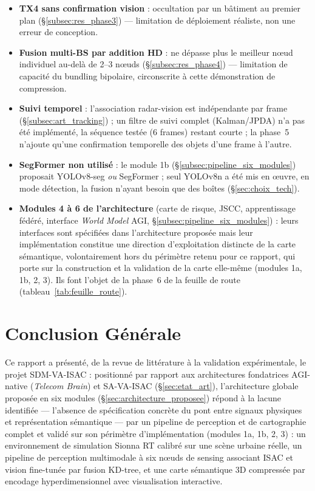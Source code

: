 \documentclass[12pt,a4paper,titlepage]{article}
\begin{document}
\begin{itemize}[leftmargin=1.5em]
    \item \textbf{TX4 sans confirmation vision} : occultation par un bâtiment au premier plan (\S\ref{subsec:res_phase3}) --- limitation de déploiement réaliste, non une erreur de conception.
    \item \textbf{Fusion multi-BS par addition HD} : ne dépasse plus le meilleur n\oe ud individuel au-delà de 2--3 n\oe uds (\S\ref{subsec:res_phase4}) --- limitation de capacité du bundling bipolaire, circonscrite à cette démonstration de compression.
    \item \textbf{Suivi temporel} : l'association radar-vision est indépendante par frame (\S\ref{subsec:art_tracking}) ; un filtre de suivi complet (Kalman/JPDA) n'a pas été implémenté, la séquence testée (6 frames) restant courte ; la phase~5 n'ajoute qu'une confirmation temporelle des objets d'une frame à l'autre.
    \item \textbf{SegFormer non utilisé} : le module 1b (\S\ref{subsec:pipeline_six_modules}) proposait YOLOv8-seg \textit{ou} SegFormer ; seul YOLOv8n a été mis en \oe uvre, en mode détection, la fusion n'ayant besoin que des boîtes (\S\ref{sec:choix_tech}).
    \item \textbf{Modules 4 à 6 de l'architecture} (carte de risque, JSCC, apprentissage fédéré, interface \textit{World Model} AGI, \S\ref{subsec:pipeline_six_modules}) : leurs interfaces sont spécifiées dans l'architecture proposée mais leur implémentation constitue une direction d'exploitation distincte de la carte sémantique, volontairement hors du périmètre retenu pour ce rapport, qui porte sur la construction et la validation de la carte elle-même (modules 1a, 1b, 2, 3). Ils font l'objet de la phase~6 de la feuille de route (tableau~\ref{tab:feuille_route}).
\end{itemize}

\section{Conclusion Générale}
\label{sec:conclusion}

Ce rapport a présenté, de la revue de littérature à la validation expérimentale, le projet SDM-VA-ISAC : positionné par rapport aux architectures fondatrices AGI-native (\textit{Telecom Brain}) et SA-VA-ISAC (\S\ref{sec:etat_art}), l'architecture globale proposée en six modules (\S\ref{sec:architecture_proposee}) répond à la lacune identifiée --- l'absence de spécification concrète du pont entre signaux physiques et représentation sémantique --- par un pipeline de perception et de cartographie complet et validé sur son périmètre d'implémentation (modules 1a, 1b, 2, 3) : un environnement de simulation Sionna RT calibré sur une scène urbaine réelle, un pipeline de perception multimodale à six n\oe uds de sensing associant ISAC et vision fine-tunée par fusion KD-tree, et une carte sémantique 3D compressée par encodage hyperdimensionnel avec visualisation interactive.
\end{document}
